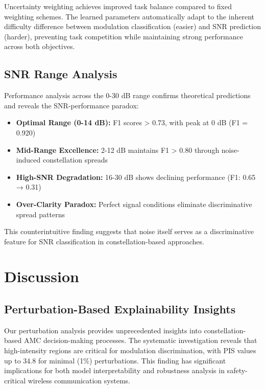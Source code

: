 \documentclass{ELSP}
\begin{document}
{{Uncertainty weighting achieves improved task balance compared to fixed weighting schemes. The learned parameters automatically adapt to the inherent difficulty difference between modulation classification (easier) and SNR prediction (harder), preventing task competition while maintaining strong performance across both objectives.

\subsection{SNR Range Analysis}

Performance analysis across the 0-30 dB range confirms theoretical predictions and reveals the SNR-performance paradox:

\begin{itemize}
    \item \textbf{Optimal Range (0-14 dB):} F1 scores > 0.73, with peak at 0 dB (F1 = 0.920)
    \item \textbf{Mid-Range Excellence:} 2-12 dB maintains F1 > 0.80 through noise-induced constellation spreads
    \item \textbf{High-SNR Degradation:} 16-30 dB shows declining performance (F1: 0.65 → 0.31)
    \item \textbf{Over-Clarity Paradox:} Perfect signal conditions eliminate discriminative spread patterns
\end{itemize}

This counterintuitive finding suggests that noise itself serves as a discriminative feature for SNR classification in constellation-based approaches.

\section{Discussion}

\subsection{Perturbation-Based Explainability Insights}

Our perturbation analysis provides unprecedented insights into constellation-based AMC decision-making processes. The systematic investigation reveals that high-intensity regions are critical for modulation discrimination, with PIS values up to 34.8 for minimal (1\%) perturbations. This finding has significant implications for both model interpretability and robustness analysis in safety-critical wireless communication systems.

}}
\end{document}
